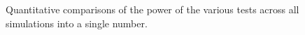 \documentclass[11pt]{article}
\begin{document}
\begin{figure}[htbp]
\hfil
{}
\hfil
{}
\hfil
{}
\caption{Quantitative comparisons of the power of the various tests across all simulations into a single number.  
}
\end{figure}
\end{document}
